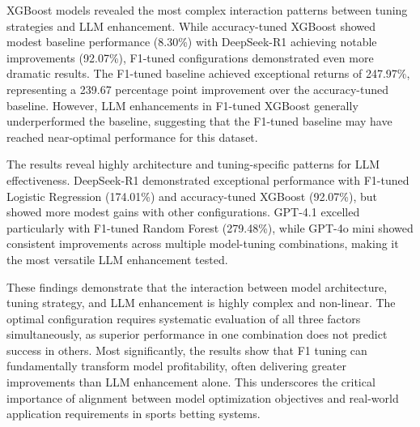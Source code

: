 \documentclass[conference]{IEEEtran}
\begin{document}
XGBoost models revealed the most complex interaction patterns between tuning strategies and LLM enhancement. While accuracy-tuned XGBoost showed modest baseline performance (8.30\%) with DeepSeek-R1 achieving notable improvements (92.07\%), F1-tuned configurations demonstrated even more dramatic results. The F1-tuned baseline achieved exceptional returns of 247.97\%, representing a 239.67 percentage point improvement over the accuracy-tuned baseline. However, LLM enhancements in F1-tuned XGBoost generally underperformed the baseline, suggesting that the F1-tuned baseline may have reached near-optimal performance for this dataset.

The results reveal highly architecture and tuning-specific patterns for LLM effectiveness. DeepSeek-R1 demonstrated exceptional performance with F1-tuned Logistic Regression (174.01\%) and accuracy-tuned XGBoost (92.07\%), but showed more modest gains with other configurations. GPT-4.1 excelled particularly with F1-tuned Random Forest (279.48\%), while GPT-4o mini showed consistent improvements across multiple model-tuning combinations, making it the most versatile LLM enhancement tested.


These findings demonstrate that the interaction between model architecture, tuning strategy, and LLM enhancement is highly complex and non-linear. The optimal configuration requires systematic evaluation of all three factors simultaneously, as superior performance in one combination does not predict success in others. Most significantly, the results show that F1 tuning can fundamentally transform model profitability, often delivering greater improvements than LLM enhancement alone. This underscores the critical importance of alignment between model optimization objectives and real-world application requirements in sports betting systems.
\end{document}
